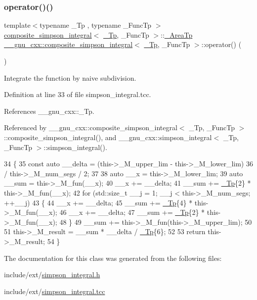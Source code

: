\subsubsection{\texorpdfstring{operator()()}{operator()()}}
{\footnotesize\ttfamily template$<$typename \+\_\+\+Tp , typename \+\_\+\+Func\+Tp $>$ \\
\hyperlink{class____gnu__cxx_1_1composite__simpson__integral}{composite\+\_\+simpson\+\_\+integral}$<$ \hyperlink{namespace____gnu__cxx_a3b19a9c800ca194374ef9172290f7d79}{\+\_\+\+Tp}, \+\_\+\+Func\+Tp $>$\+::\hyperlink{class____gnu__cxx_1_1composite__simpson__integral_a1a3ef5313bafc1d8523f2d517b066a7a}{\+\_\+\+Area\+Tp} \hyperlink{class____gnu__cxx_1_1composite__simpson__integral}{\+\_\+\+\_\+gnu\+\_\+cxx\+::composite\+\_\+simpson\+\_\+integral}$<$ \hyperlink{namespace____gnu__cxx_a3b19a9c800ca194374ef9172290f7d79}{\+\_\+\+Tp}, \+\_\+\+Func\+Tp $>$\+::operator() (\begin{DoxyParamCaption}{ }\end{DoxyParamCaption})}

Integrate the function by naive subdivision. 

Definition at line 33 of file simpson\+\_\+integral.\+tcc.



References \+\_\+\+\_\+gnu\+\_\+cxx\+::\+\_\+\+Tp.



Referenced by \+\_\+\+\_\+gnu\+\_\+cxx\+::composite\+\_\+simpson\+\_\+integral$<$ \+\_\+\+Tp, \+\_\+\+Func\+Tp $>$\+::composite\+\_\+simpson\+\_\+integral(), and \+\_\+\+\_\+gnu\+\_\+cxx\+::simpson\+\_\+integral$<$ \+\_\+\+Tp, \+\_\+\+Func\+Tp $>$\+::simpson\+\_\+integral().


\begin{DoxyCode}
34     \{
35       \textcolor{keyword}{const} \textcolor{keyword}{auto} \_\_delta = (this->\_M\_upper\_lim - this->\_M\_lower\_lim)
36                            / this->\_M\_num\_segs / 2;
37 
38       \textcolor{keyword}{auto} \_\_x = this->\_M\_lower\_lim;
39       \textcolor{keyword}{auto} \_\_sum = this->\_M\_fun(\_\_x);
40       \_\_x += \_\_delta;
41       \_\_sum += \hyperlink{namespace____gnu__cxx_a3b19a9c800ca194374ef9172290f7d79}{\_Tp}\{2\} * this->\_M\_fun(\_\_x);
42       \textcolor{keywordflow}{for} (std::size\_t \_\_j = 1; \_\_j < this->\_M\_num\_segs; ++\_\_j)
43         \{
44           \_\_x += \_\_delta;
45           \_\_sum += \hyperlink{namespace____gnu__cxx_a3b19a9c800ca194374ef9172290f7d79}{\_Tp}\{4\} * this->\_M\_fun(\_\_x);
46           \_\_x += \_\_delta;
47           \_\_sum += \hyperlink{namespace____gnu__cxx_a3b19a9c800ca194374ef9172290f7d79}{\_Tp}\{2\} * this->\_M\_fun(\_\_x);
48         \}
49       \_\_sum += this->\_M\_fun(this->\_M\_upper\_lim);
50 
51       this->\_M\_result = \_\_sum * \_\_delta / \hyperlink{namespace____gnu__cxx_a3b19a9c800ca194374ef9172290f7d79}{\_Tp}\{6\};
52 
53       \textcolor{keywordflow}{return} this->\_M\_result;
54     \}
\end{DoxyCode}


The documentation for this class was generated from the following files\+:\begin{DoxyCompactItemize}
\item 
include/ext/\hyperlink{simpson__integral_8h}{simpson\+\_\+integral.\+h}\item 
include/ext/\hyperlink{simpson__integral_8tcc}{simpson\+\_\+integral.\+tcc}\end{DoxyCompactItemize}
